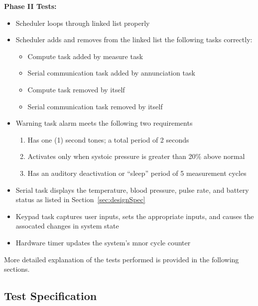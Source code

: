 \documentclass[12pt]{article} %
\begin{document}
    \textbf{Phase II Tests:}
    \begin{itemize}
      \item Scheduler loops through linked list properly
      \item Scheduler adds and removes from the linked list the following tasks
	correctly:
	\begin{itemize}
	  \item Compute task added by measure task
	  \item Serial communication task added by annunciation task
	  \item Compute task removed by itself
	  \item Serial communication task removed by itself
	\end{itemize}
      \item Warning task alarm meets the following two requirements
	\begin{enumerate}
	  \item Has one (1) second tones; a total period of 2 seconds
	  \item Activates only when systoic pressure is greater than 20\% above
	    normal
	  \item Has an auditory deactivation or ``sleep'' period of 5
	    measurement cycles
	\end{enumerate}
	\item Serial task displays the temperature, blood pressure, pulse rate,
	  and battery status as listed in Section~\ref{sec:designSpec}
	\item Keypad task captures user inputs, sets the appropriate inputs,
	  and causes the assocated changes in system state
	\item Hardware timer updates the system's mnor cycle counter
    \end{itemize}

    More detailed explanation of the tests performed is provided in the
    following sections.
    
    \subsection{Test Specification} 

%
\end{document}
